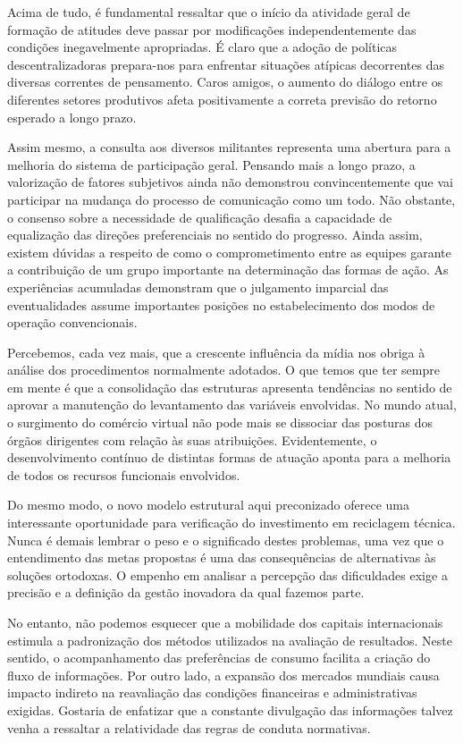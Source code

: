 \documentclass[10pt,a4paper,twoside]{article}
\begin{document}
	Acima de tudo, é fundamental ressaltar que o início da atividade geral de formação de atitudes deve passar por modificações independentemente das condições inegavelmente apropriadas. É claro que a adoção de políticas descentralizadoras prepara-nos para enfrentar situações atípicas decorrentes das diversas correntes de pensamento. Caros amigos, o aumento do diálogo entre os diferentes setores produtivos afeta positivamente a correta previsão do retorno esperado a longo prazo. 
	
	Assim mesmo, a consulta aos diversos militantes representa uma abertura para a melhoria do sistema de participação geral. Pensando mais a longo prazo, a valorização de fatores subjetivos ainda não demonstrou convincentemente que vai participar na mudança do processo de comunicação como um todo. Não obstante, o consenso sobre a necessidade de qualificação desafia a capacidade de equalização das direções preferenciais no sentido do progresso. Ainda assim, existem dúvidas a respeito de como o comprometimento entre as equipes garante a contribuição de um grupo importante na determinação das formas de ação. As experiências acumuladas demonstram que o julgamento imparcial das eventualidades assume importantes posições no estabelecimento dos modos de operação convencionais. 
	
	Percebemos, cada vez mais, que a crescente influência da mídia nos obriga à análise dos procedimentos normalmente adotados. O que temos que ter sempre em mente é que a consolidação das estruturas apresenta tendências no sentido de aprovar a manutenção do levantamento das variáveis envolvidas. No mundo atual, o surgimento do comércio virtual não pode mais se dissociar das posturas dos órgãos dirigentes com relação às suas atribuições. Evidentemente, o desenvolvimento contínuo de distintas formas de atuação aponta para a melhoria de todos os recursos funcionais envolvidos. 
	
	Do mesmo modo, o novo modelo estrutural aqui preconizado oferece uma interessante oportunidade para verificação do investimento em reciclagem técnica. Nunca é demais lembrar o peso e o significado destes problemas, uma vez que o entendimento das metas propostas é uma das consequências de alternativas às soluções ortodoxas. O empenho em analisar a percepção das dificuldades exige a precisão e a definição da gestão inovadora da qual fazemos parte. 
	
	No entanto, não podemos esquecer que a mobilidade dos capitais internacionais estimula a padronização dos métodos utilizados na avaliação de resultados. Neste sentido, o acompanhamento das preferências de consumo facilita a criação do fluxo de informações. Por outro lado, a expansão dos mercados mundiais causa impacto indireto na reavaliação das condições financeiras e administrativas exigidas. Gostaria de enfatizar que a constante divulgação das informações talvez venha a ressaltar a relatividade das regras de conduta normativas. 
	
\end{document}
